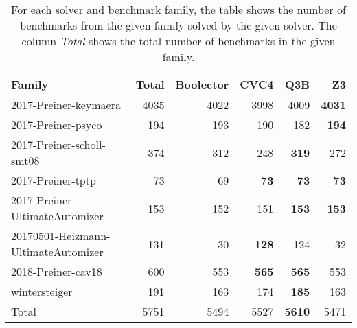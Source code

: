 \begin{table}[tbp]
\centering
\begin{tabular}{lrrrrr}
  \toprule
Family & Total & Boolector & CVC4 & Q3B & Z3 \\ 
  \midrule
2017-Preiner-keymaera & 4035 & 4022 & 3998 & 4009 & \textbf{4031} \\ 
  2017-Preiner-psyco & 194 & 193 & 190 & 182 & \textbf{194} \\ 
  2017-Preiner-scholl-smt08 & 374 & 312 & 248 & \textbf{319} & 272 \\ 
  2017-Preiner-tptp &  73 &  69 & \textbf{73} & \textbf{73} & \textbf{73} \\ 
  2017-Preiner-UltimateAutomizer & 153 & 152 & 151 & \textbf{153} & \textbf{153} \\ 
  20170501-Heizmann-UltimateAutomizer & 131 &  30 & \textbf{128} & 124 & 32 \\ 
  2018-Preiner-cav18 & 600 & 553 & \textbf{565} & \textbf{565} & 553 \\ 
  wintersteiger & 191 & 163 & 174 & \textbf{185} & 163 \\ 
   \midrule
Total & 5751 & 5494 & 5527 & \textbf{5610} & 5471 \\ 
   \bottomrule
\end{tabular}
\caption{For each solver and benchmark family, the table shows the number of benchmarks from the given family solved by the given solver. The column \emph{Total} shows the total number of benchmarks in the given family.} 
\label{tbl:solved}
\end{table}
